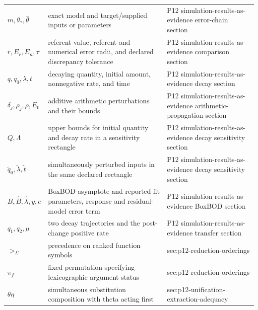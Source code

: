 \begin{longtable}{@{}p{}p{}p{}@{}}
\(m,\allowbreak \theta_*,\allowbreak \widehat\theta\) & exact model and target/supplied inputs or parameters & P12 simulation-\allowbreak{}results-\allowbreak{}as-\allowbreak{}evidence error-\allowbreak{}chain section \\
\(r,\allowbreak E_r,\allowbreak E_n,\allowbreak \tau\) & referent value, referent and numerical error radii, and declared discrepancy tolerance & P12 simulation-\allowbreak{}results-\allowbreak{}as-\allowbreak{}evidence comparison section \\
\(q,\allowbreak q_0,\allowbreak \lambda,\allowbreak t\) & decaying quantity, initial amount, nonnegative rate, and time & P12 simulation-\allowbreak{}results-\allowbreak{}as-\allowbreak{}evidence decay section \\
\(\delta_j,\allowbreak \rho_j,\allowbreak \rho,\allowbreak E_0\) & additive arithmetic perturbations and their bounds & P12 simulation-\allowbreak{}results-\allowbreak{}as-\allowbreak{}evidence arithmetic-\allowbreak{}propagation section \\
\(Q,\allowbreak \Lambda\) & upper bounds for initial quantity and decay rate in a sensitivity rectangle & P12 simulation-\allowbreak{}results-\allowbreak{}as-\allowbreak{}evidence decay sensitivity section \\
\(\widetilde q_0,\allowbreak \widetilde\lambda,\allowbreak \widetilde t\) & simultaneously perturbed inputs in the same declared rectangle & P12 simulation-\allowbreak{}results-\allowbreak{}as-\allowbreak{}evidence decay sensitivity section \\
\(B,\allowbreak \widehat B,\allowbreak \widehat\lambda,\allowbreak y,\allowbreak e\) & BoxBOD asymptote and reported fit parameters, response and residual-model error term & P12 simulation-\allowbreak{}results-\allowbreak{}as-\allowbreak{}evidence BoxBOD section \\
\(q_1,\allowbreak q_2,\allowbreak \mu\) & two decay trajectories and the post-change positive rate & P12 simulation-\allowbreak{}results-\allowbreak{}as-\allowbreak{}evidence transfer section \\
\(>_\Sigma\) & precedence on ranked function symbols & sec:\allowbreak{}p12-\allowbreak{}reduction-\allowbreak{}orderings \\
\(\pi_f\) & fixed permutation specifying lexicographic argument status & sec:\allowbreak{}p12-\allowbreak{}reduction-\allowbreak{}orderings \\
\(\theta\eta\) & simultaneous substitution composition with theta acting first & sec:\allowbreak{}p12-\allowbreak{}unification-\allowbreak{}extraction-\allowbreak{}adequacy \\

\end{longtable}
